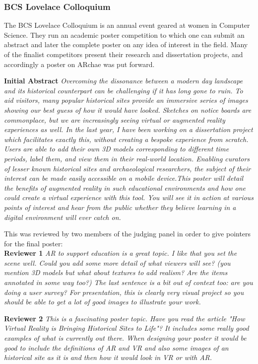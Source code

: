 \documentclass[12pt, a4paper]{article}
\begin{document}
\subsubsection{BCS Lovelace Colloquium}
The BCS Lovelace Colloquium is an annual event geared at women in Computer Science. They run an academic poster competition to which one can submit an abstract and later the complete poster on any idea of interest in the field. Many of the finalist competitors present their research and dissertation projects, and accordingly a poster on ARchae was put forward. 

\textbf{Initial Abstract} \textit{Overcoming the dissonance between a modern day landscape and its historical counterpart can be challenging if it has long gone to ruin. To aid visitors, many popular historical sites provide an immersive series of images showing our best guess of how it would have looked. Sketches on notice boards are commonplace, but we are increasingly seeing virtual or augmented reality experiences as well. In the last year, I have been working on a dissertation project which facilitates exactly this, without creating a bespoke experience from scratch. Users are able to add their own 3D models corresponding to different time periods, label them, and view them in their real-world location. Enabling curators of lesser known historical sites and archaeological researchers, the subject of their interest can be made easily accessible on a mobile device.This poster will detail the benefits of augmented reality in such educational environments and how one could create a virtual experience with this tool. You will see it in action at various points of interest and hear from the public whether they believe learning in a digital environment will ever catch on.}

This was reviewed by two members of the judging panel in order to give pointers for the final poster:\\
\textbf{Reviewer 1}
\textit{AR to support education is a great topic. I like that you set the scene well. Could you add some more detail of what viewers will see? (you mention 3D models but what about textures to add realism? Are the items annotated in some way too?) The last sentence is a bit out of context too: are you doing a user survey? For presentation, this is clearly very visual project so you should be able to get a lot of good images to illustrate your work.}

\textbf{Reviewer 2}
\textit{This is a fascinating poster topic. Have you read the article "How Virtual Reality is Bringing Historical Sites to Life"? It includes some really good examples of what is currently out there. When designing your poster it would be good to include the definitions of AR and VR and also some images of an historical site as it is and then how it would look in VR or with AR.}
\end{document}
